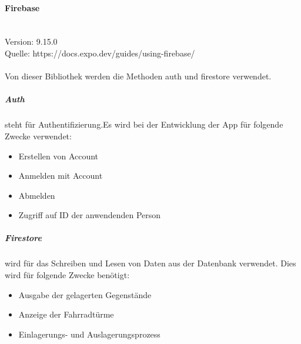 \paragraph{Firebase}\mbox{}\\
Version: 9.15.0\\
Quelle: https://docs.expo.dev/guides/using-firebase/\\ \\
Von dieser Bibliothek werden die Methoden auth und firestore verwendet.\\
\subparagraph{Auth}steht für Authentifizierung.Es wird bei der Entwicklung der App für folgende Zwecke verwendet:
\begin{itemize}
  \item Erstellen von Account
  \item Anmelden mit Account
  \item Abmelden
  \item Zugriff auf ID der anwendenden Person
\end{itemize}

\subparagraph{Firestore}wird für das Schreiben und Lesen von Daten aus der Datenbank verwendet. Dies wird für folgende Zwecke benötigt:
\begin{itemize}
  \item Ausgabe der gelagerten Gegenstände
  \item Anzeige der Fahrradtürme
  \item Einlagerungs- und Auslagerungsprozess
\end{itemize}

